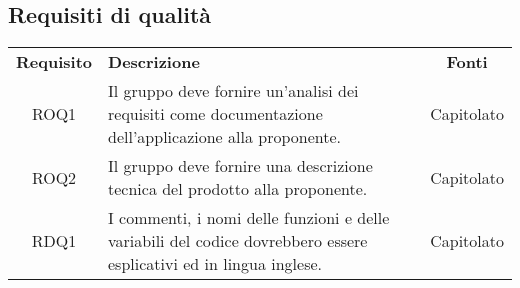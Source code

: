 \subsection{Requisiti di qualità}
\begin{longtable}{| c | p{10cm} | c |}
		\rowcolor{LightBlue}
		\color{white}\bfseries Requisito & \color{white}\bfseries Descrizione & \color{white}\bfseries Fonti\\[0.25cm]
		ROQ1 & Il gruppo deve fornire un'analisi dei requisiti come documentazione dell'applicazione alla proponente. & Capitolato \\
		ROQ2 & Il gruppo deve fornire una descrizione tecnica del prodotto alla proponente. & Capitolato \\ 
		RDQ1 & I commenti, i nomi delle funzioni e delle variabili del codice dovrebbero essere esplicativi ed in lingua inglese. & Capitolato \\ \hline
\end{longtable}